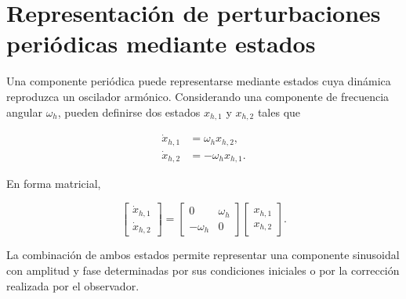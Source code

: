 %
%
%
%



\section{Representación de perturbaciones periódicas mediante estados}

%

Una componente periódica puede representarse mediante estados cuya dinámica 
reproduzca un oscilador armónico. Considerando una componente de frecuencia 
angular $\omega_h$, pueden definirse dos estados $x_{h,1}$ y $x_{h,2}$ tales 
que

\begin{equation}
\begin{aligned}
\dot{x}_{h,1} &= \omega_h x_{h,2},\\
\dot{x}_{h,2} &= -\omega_h x_{h,1}.
\end{aligned}
\end{equation}

En forma matricial,

\begin{equation}
\begin{bmatrix}
\dot{x}_{h,1}\\
\dot{x}_{h,2}
\end{bmatrix}
=
\begin{bmatrix}
0 & \omega_h\\
-\omega_h & 0
\end{bmatrix}
\begin{bmatrix}
x_{h,1}\\
x_{h,2}
\end{bmatrix}.
\end{equation}

La combinación de ambos estados permite representar una componente sinusoidal 
con amplitud y fase determinadas por sus condiciones iniciales o por la 
corrección realizada por el observador.

